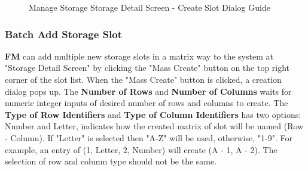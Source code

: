 \begin{figure}[H]
	\centering
    \hspace{10pt}
  
    \vspace{10pt}
    
    \caption{Manage Storage Storage Detail Screen - Create Slot Dialog Guide}
	\label{fig:MSobjCreateSlotGuide}
\end{figure}


\subsubsection{Batch Add Storage Slot}

\textbf{FM} can add multiple new storage slots in a matrix way to the system at "Storage Detail Screen" by clicking the "Mass Create" button on the top right corner of the slot list.
When the "Mass Create" button is clicked, a creation dialog pops up. The \textbf{Number of Rows} and \textbf{Number of Columns} waits for numeric integer inputs of desired number of rows and columns to create. The \textbf{Type of Row Identifiers} and \textbf{Type of Column Identifiers} has two options: Number and Letter, indicates how the created matrix of slot will be named (Row - Column). If "Letter" is selected then "A-Z" will be used, otherwise, "1-9". For example, an entry of (1, Letter, 2, Number) will create (A - 1, A - 2). The selection of row and column type should not be the same.

